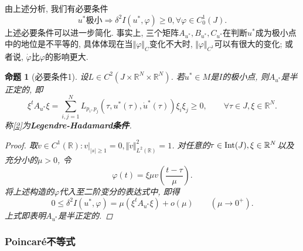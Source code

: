 \documentclass[12pt,a4paper]{article}
\newtheorem{proposition}[theorem]{命题}
\begin{document}
由上述分析, 我们有必要条件
\begin{equation*}
    u^*\text{极小} \Rightarrow \delta^2I(u^*, \varphi) \geq 0, \forall\varphi \in C_0^1(J).
\end{equation*}
上述必要条件可以进一步简化. 事实上, 三个矩阵$A_{u^*}, B_{u^*}, C_{u^*}$在判断$u^*$成为极小点中的地位是不平等的, 具体体现在当$\Vert \varphi \Vert_C$变化不大时, $\Vert \varphi \Vert_{C^1}$可以有很大的变化;
或者说, $\dot\varphi$比$\varphi$的影响更大.

\begin{proposition}[必要条件1]
    设$L \in C^2(J \times \mathbb{R}^N \times \mathbb{R}^N)$. 若$u^* \in M$是$I$的极小点, 则$A_{u^*}$是半正定的, 即
    \begin{equation}\label{2}
        \boxed{\xi^tA_{u^*}\xi = \sum\limits_{i, j = 1}^NL_{p_i, p_j}(\tau, u^*(\tau), \dot{u}^*(\tau))\xi_i\xi_j \geq 0, \qquad \forall \tau \in J, \xi \in \mathbb{R}^N.}
    \end{equation}
    称\eqref{2}为\textbf{Legendre-Hadamard条件}.
    \begin{proof}
        取$v \in C^1(\mathbb{R})\colon v|_{|s| \geq 1} = 0, \Vert \dot v \Vert_{L^2(\mathbb{R})}^2 = 1$.
        对任意的$\tau \in {\rm Int}(J), \xi \in \mathbb{R}^N$以及充分小的$\mu > 0$, 令 
        \begin{equation*}
            \varphi(t) = \xi\mu v\left(\frac{t - \tau}{\mu}\right).
        \end{equation*}
        将上述构造的$\varphi$代入至二阶变分的表达式中, 即得 
        \begin{equation*}
            0 \leq \delta^2I(u^*, \varphi) = \mu(\xi^tA_{u^*}\xi) + o(\mu) \qquad (\mu \rightarrow 0^+). 
        \end{equation*}
        上式即表明$A_{u^*}$是半正定的.
    \end{proof}
\end{proposition}

\subsubsection{Poincaré不等式}
\end{document}
